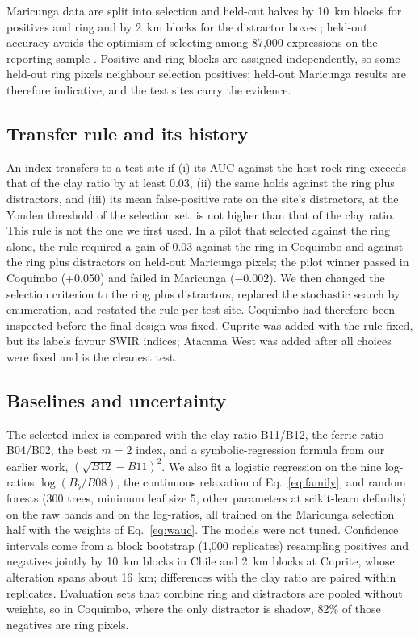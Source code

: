 \documentclass[preprint,authoryear,number]{elsarticle}
\begin{document}
Maricunga data are split into selection and held-out halves by \SI{10}{\kilo\meter} blocks for positives and ring and by \SI{2}{\kilo\meter} blocks for the distractor boxes \citep{Roberts2017,Meyer2022}; held-out accuracy avoids the optimism of selecting among 87{,}000 expressions on the reporting sample \citep{Ambroise2002}. Positive and ring blocks are assigned independently, so some held-out ring pixels neighbour selection positives; held-out Maricunga results are therefore indicative, and the test sites carry the evidence.

\subsection{Transfer rule and its history}
\label{sec:gate}

An index transfers to a test site if (i) its AUC against the host-rock ring exceeds that of the clay ratio by at least 0.03, (ii) the same holds against the ring plus distractors, and (iii) its mean false-positive rate on the site's distractors, at the Youden threshold of the selection set, is not higher than that of the clay ratio. This rule is not the one we first used. In a pilot that selected against the ring alone, the rule required a gain of 0.03 against the ring in Coquimbo and against the ring plus distractors on held-out Maricunga pixels; the pilot winner passed in Coquimbo (+0.050) and failed in Maricunga ($-0.002$). We then changed the selection criterion to the ring plus distractors, replaced the stochastic search by enumeration, and restated the rule per test site. Coquimbo had therefore been inspected before the final design was fixed. Cuprite was added with the rule fixed, but its labels favour SWIR indices; Atacama West was added after all choices were fixed and is the cleanest test.

\subsection{Baselines and uncertainty}
\label{sec:baselines}

The selected index is compared with the clay ratio B11/B12, the ferric ratio B04/B02, the best $m = 2$ index, and a symbolic-regression formula from our earlier work, $(\sqrt{B12} - B11)^2$. We also fit a logistic regression on the nine log-ratios $\log(B_b/B08)$, the continuous relaxation of Eq.~\ref{eq:family}, and random forests (300 trees, minimum leaf size 5, other parameters at scikit-learn defaults) on the raw bands and on the log-ratios, all trained on the Maricunga selection half with the weights of Eq.~\ref{eq:wauc}. The models were not tuned. Confidence intervals come from a block bootstrap (1{,}000 replicates) resampling positives and negatives jointly by \SI{10}{\kilo\meter} blocks in Chile and \SI{2}{\kilo\meter} blocks at Cuprite, whose alteration spans about \SI{16}{\kilo\meter}; differences with the clay ratio are paired within replicates. Evaluation sets that combine ring and distractors are pooled without weights, so in Coquimbo, where the only distractor is shadow, 82\% of those negatives are ring pixels.
\end{document}
